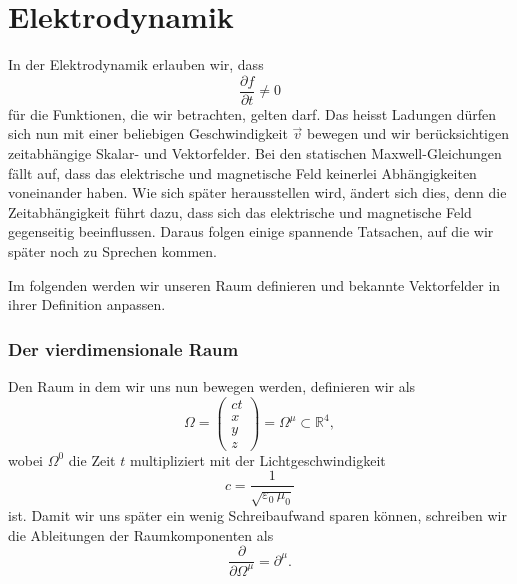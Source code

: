 %
%
%
%
\tikzset{>=latex} %

\section{Elektrodynamik\label{section:maxwell:elektrodynmaik}}
In der Elektrodynamik erlauben wir, dass
\[
\frac{\partial f}{\partial t}
\neq
0
\]
für die Funktionen, die wir betrachten, gelten darf.
Das heisst Ladungen dürfen sich nun mit einer beliebigen Geschwindigkeit $\vec{v}$ bewegen und wir berücksichtigen zeitabhängige Skalar- und Vektorfelder.
Bei den statischen Maxwell-Gleichungen fällt auf, dass das elektrische und magnetische Feld keinerlei Abhängigkeiten voneinander haben.
Wie sich später herausstellen wird, ändert sich dies, denn die Zeitabhängigkeit führt dazu, dass sich das elektrische und magnetische Feld gegenseitig beeinflussen.
Daraus folgen einige spannende Tatsachen, auf die wir später noch zu Sprechen kommen.
 
Im folgenden werden wir unseren Raum definieren und bekannte Vektorfelder in ihrer Definition anpassen.

\subsubsection{Der vierdimensionale Raum}
Den Raum in dem wir uns nun bewegen werden, definieren wir als
\begin{equation}
	\Omega
	=
	\begin{pmatrix}
		ct\\
		x\\
		y\\
		z
	\end{pmatrix}
	=
	\Omega^{\mu} \subset \mathbb{R}^4,
\end{equation}
wobei $\Omega^0$ die Zeit $t$ multipliziert mit der Lichtgeschwindigkeit
\[
c
=
\frac{1}{\sqrt{\varepsilon_0\,\mu_0}}
\]
ist.
Damit wir uns später ein wenig Schreibaufwand sparen können, schreiben wir die Ableitungen der Raumkomponenten als
\[
\frac{\partial}{\partial \Omega^{\mu}}
=
\partial^{\mu}.
\]

